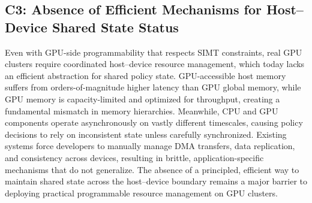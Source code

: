 \subsection{C3: Absence of Efficient Mechanisms for Host–Device Shared State Status}

Even with GPU-side programmability that respects SIMT constraints, real GPU clusters require coordinated host–device resource management, which today lacks an efficient abstraction for shared policy state. 
GPU-accessible host memory suffers from orders-of-magnitude higher latency than GPU global memory, while GPU memory is capacity-limited and optimized for throughput, creating a fundamental mismatch in memory hierarchies. 
Meanwhile, CPU and GPU components operate asynchronously on vastly different timescales, causing policy decisions to rely on inconsistent state unless carefully synchronized. 
Existing systems force developers to manually manage DMA transfers, data replication, and consistency across devices, resulting in brittle, application-specific mechanisms that do not generalize.
The absence of a principled, efficient way to maintain shared state across the host–device boundary remains a major barrier to deploying practical programmable resource management on GPU clusters.



